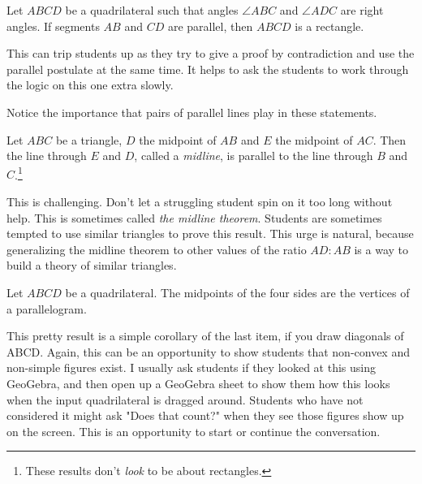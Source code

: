 \begin{conjecture}\label{conj:opp-parallel-implies-rectangle}
Let $ABCD$ be a quadrilateral such that angles $\angle ABC$ and $\angle ADC$ are right angles.
If segments $AB$ and $CD$ are parallel, then $ABCD$ is a rectangle.
\end{conjecture}

\begin{annotation}
{
\color{blue}
This can trip students up as they try to give a proof by contradiction and use the parallel postulate at the same time. It helps to ask the students to work through the logic on this one extra slowly.
}
\end{annotation}

Notice the importance that pairs of parallel lines play in these statements.



\begin{conjecture} \label{conj:midline-theorem}
Let $ABC$ be a triangle, $D$ the midpoint of $AB$ and $E$ the midpoint of $AC$.
Then the line through $E$ and $D$, called a \emph{midline}, is parallel to the line through $B$ and $C$.\footnote{These results don't \emph{look} to be about rectangles.}
\end{conjecture}

\begin{annotation}
{
\color{blue}
This is challenging. Don't let a struggling student spin on it too long without help. This is sometimes called \emph{the midline theorem}. Students are sometimes tempted to use similar triangles to prove this result. This urge is natural, because generalizing the midline theorem to other values of the ratio $AD:AB$ is a way to build a theory of similar triangles.
}
\end{annotation}


\begin{conjecture}\label{conj:Varignon}
Let $ABCD$ be a quadrilateral. The midpoints of the four sides are the vertices of a parallelogram.
\end{conjecture}

\begin{annotation}
{
\color{blue}
This pretty result is a simple corollary of the last item, if you draw diagonals of ABCD. Again, this can be an opportunity to show students that non-convex and non-simple figures exist. I usually ask students if they looked at this using GeoGebra, and then open up a GeoGebra sheet to show them how this looks when the input quadrilateral is dragged around. Students who have not considered it might ask "Does that count?" when they see those figures show up on the screen. This is an opportunity to start or continue the conversation.
}
\end{annotation}



